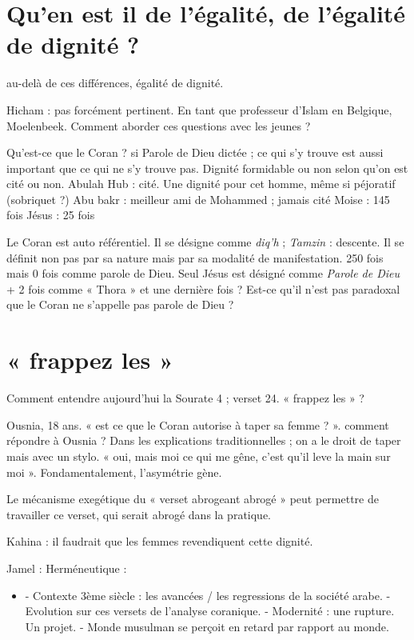 \section{Qu’en est il de l’égalité, de l’égalité de dignité ? }
au-delà de ces différences, égalité de dignité.

Hicham : pas forcément pertinent. En tant que professeur d’Islam en Belgique, Moelenbeek. Comment aborder ces questions avec les jeunes ?

Qu’est-ce que le Coran ? si Parole de Dieu dictée ; ce qui s’y trouve est aussi important que ce qui ne s’y trouve pas. Dignité formidable ou non selon qu’on est cité ou non.
Abulah Hub : cité. Une dignité pour cet homme, même si péjoratif (sobriquet ?)
Abu bakr : meilleur ami de Mohammed ; jamais cité
Moise : 145 fois
Jésus :  25 fois

Le Coran est auto référentiel. Il se désigne comme \textit{diq’h}  ; \textit{Tamzin} : descente. Il se définit non pas par sa nature mais par sa modalité de manifestation. 250 fois mais 0 fois comme parole de Dieu. Seul Jésus est désigné comme \textit{Parole de Dieu} + 2 fois comme « Thora » et une dernière fois ? 
Est-ce qu’il n’est pas paradoxal que le Coran ne s’appelle pas parole de Dieu ?

\section{« frappez les »}

Comment entendre aujourd'hui la Sourate 4 ; verset 24.  « frappez les » ?
\begin{Ex}
Ousnia, 18 ans.  « est ce que le Coran autorise à taper sa femme ? ». comment répondre à Ousnia ? Dans les explications traditionnelles ; on a le droit de taper mais avec un stylo. « oui, mais moi ce qui me gêne, c’est qu’il leve la main sur moi ». Fondamentalement, l’asymétrie gène.
\end{Ex}

Le mécanisme exegétique du « verset abrogeant abrogé »  peut permettre de travailler ce verset, qui serait abrogé dans la pratique.

Kahina : il faudrait que les femmes revendiquent cette dignité.

Jamel : 
Herméneutique : 
\begin{itemize}
    \item -	Contexte 3ème siècle : les avancées / les regressions de la société arabe. 
-	Evolution sur ces versets de l’analyse coranique.
-	Modernité : une rupture. Un projet. 
-	Monde musulman se perçoit en retard par rapport au monde. 
\end{itemize}

